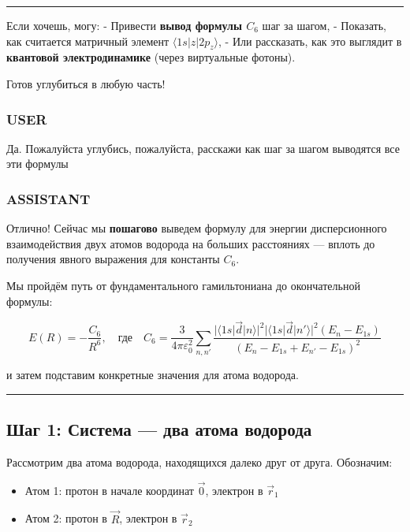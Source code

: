 \documentclass[11pt]{article}
\providecommand{\tightlist}{%
      \setlength{\itemsep}{0pt}\setlength{\parskip}{0pt}}
\begin{document}
\begin{center}\rule{0.5\linewidth}{\linethickness}\end{center}

Если хочешь, могу: - Привести \textbf{вывод формулы \(C_6\)} шаг за
шагом, - Показать, как считается матричный элемент
\(\langle 1s| z |2p_z \rangle\), - Или рассказать, как это выглядит в
\textbf{квантовой электродинамике} (через виртуальные фотоны).

Готов углубиться в любую часть!

\subsubsection{USER}\label{user-2}

Да. Пожалуйста углубись, пожалуйста, расскажи как шаг за шагом выводятся
все эти формулы

\subsubsection{ASSISTANT}\label{assistant-2}

Отлично! Сейчас мы \textbf{пошагово} выведем формулу для энергии
дисперсионного взаимодействия двух атомов водорода на больших
расстояниях --- вплоть до получения явного выражения для константы
\(C_6\).

Мы пройдём путь от фундаментального гамильтониана до окончательной
формулы:

\[
E(R) = -\frac{C_6}{R^6}, \quad \text{где} \quad C_6 = \frac{3}{4\pi\varepsilon_0^2} \sum_{n,n'} \frac{|\langle 1s|\vec{d}|n \rangle|^2 |\langle 1s|\vec{d}|n' \rangle|^2 (E_n - E_{1s})}{(E_n - E_{1s} + E_{n'} - E_{1s})^2}
\]

и затем подставим конкретные значения для атома водорода.

\begin{center}\rule{0.5\linewidth}{\linethickness}\end{center}

\subsection{Шаг 1: Система --- два атома
водорода}\label{ux448ux430ux433-1-ux441ux438ux441ux442ux435ux43cux430-ux434ux432ux430-ux430ux442ux43eux43cux430-ux432ux43eux434ux43eux440ux43eux434ux430}

Рассмотрим два атома водорода, находящихся далеко друг от друга.
Обозначим:

\begin{itemize}
\tightlist
\item
  Атом 1: протон в начале координат \(\vec{0}\), электрон в
  \(\vec{r}_1\)
\item
  Атом 2: протон в \(\vec{R}\), электрон в \(\vec{r}_2\)
\end{itemize}
\end{document}
